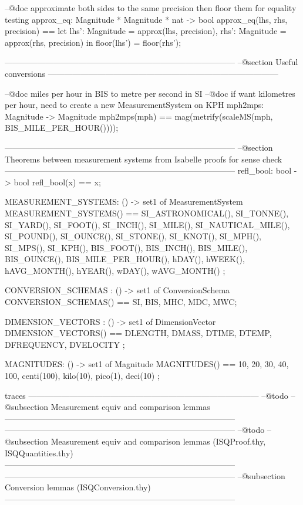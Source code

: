 \documentclass[a4paper]{article}
\begin{document}
\begin{vdm_al}
 --@doc approximate  both sides to the same precision then floor them for equality testing
 approx_eq: Magnitude * Magnitude * nat -> bool
 approx_eq(lhs, rhs, precision) == 
  let 
   lhs': Magnitude = approx(lhs, precision),
   rhs': Magnitude = approx(rhs, precision)
   in
    floor(lhs') = floor(rhs');

------------------------------------------------------------------------------------
--@section Useful conversions
------------------------------------------------------------------------------------
 
 --@doc miles per hour in BIS to metre per second in SI
 --@doc if want kilometres per hour, need to create a new MeasurementSystem on KPH
 mph2mps: Magnitude -> Magnitude
 mph2mps(mph) == mag(metrify(scaleMS(mph, BIS_MILE_PER_HOUR())));
 
------------------------------------------------------------------------------------
--@section Theorems between measurement systems from Isabelle proofs for sense check
------------------------------------------------------------------------------------
 refl_bool: bool -> bool
 refl_bool(x) == x; 

 MEASUREMENT_SYSTEMS: () -> set1 of MeasurementSystem 
 MEASUREMENT_SYSTEMS() ==
    {SI_ASTRONOMICAL(), SI_TONNE(), SI_YARD(), SI_FOOT(), 
     SI_INCH(), SI_MILE(), SI_NAUTICAL_MILE(), SI_POUND(), SI_OUNCE(), SI_STONE(), 
     SI_KNOT(), SI_MPH(), SI_MPS(), SI_KPH(), BIS_FOOT(), 
     BIS_INCH(), BIS_MILE(), BIS_OUNCE(), 
     BIS_MILE_PER_HOUR(), hDAY(), hWEEK(), hAVG_MONTH(), hYEAR(), wDAY(), wAVG_MONTH()
    };
    
 CONVERSION_SCHEMAS : () -> set1 of ConversionSchema
 CONVERSION_SCHEMAS() == {SI, BIS, MHC, MDC, MWC};
 
 DIMENSION_VECTORS  : () -> set1 of DimensionVector  
 DIMENSION_VECTORS() == 
    {DLENGTH, DMASS, DTIME, DTEMP, 
    DFREQUENCY, DVELOCITY
    };
    
 MAGNITUDES: () -> set1 of Magnitude
 MAGNITUDES() == { 10, 20, 30, 40, 100, centi(100), kilo(10), pico(1), deci(10) };

traces
------------------------------------------------------------------------------------
--@todo
--@subsection Measurement equiv and comparison lemmas 
------------------------------------------------------------------------------------
------------------------------------------------------------------------------------
--@todo
--@subsection Measurement equiv and comparison lemmas (ISQProof.thy, ISQQuantities.thy)
------------------------------------------------------------------------------------
------------------------------------------------------------------------------------
--@subsection Conversion lemmas (ISQConversion.thy)
------------------------------------------------------------------------------------


\end{vdm_al}
\end{document}
